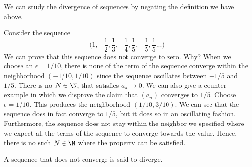 We can study the divergence of sequences by negating the definition we have above. 
\begin{example}{}{}
Consider the sequence 
\[ \Big(1, -\frac{1}{2}, \frac{1}{3}, -\frac{1}{4}, \frac{1}{5}, -\frac{1}{5}, \frac{1}{5}...  \Big)\]
We can prove that this sequence does not converge to zero. Why? When we choose an \( \epsilon  = 1/10 \), there is none of the term of the sequence converge within the neighborhood \( (-1/10, 1/10 )\) since the sequence oscillates between \(-1 / 5 \)  and \( 1 / 5\). There is no \( N \in \N \), that satisfies \( a_n \to 0 \). We can also give a counter-example in which we disprove the claim that \( (a_n) \) converges to \( 1 / 5 \). Choose \( \epsilon = 1 / 10 \). This produces the neighborhood \( (1/10, 3/10 ) \). We can see that the sequence does in fact converge to \( 1 / 5 \), but it does so in an oscillating fashion. Furthermore, the sequence does not stay within the neighbor we specified where we expect all the terms of the sequence to converge towards the value. Hence, there is no such \( N \in \N \) where the property can be satisfied.  
\end{example}


\begin{definition}{}{}
A sequence that does not converge is said to diverge.
\end{definition}


